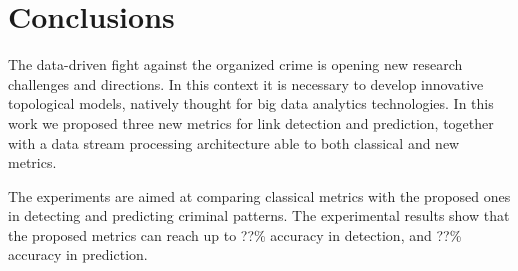 \section{Conclusions}
\label{sec:conclusions}

The data-driven fight against the organized crime is opening new research challenges and directions. 
In this context it is necessary to develop innovative topological models, natively thought for big data analytics technologies.
In this work we proposed three new metrics for link detection and prediction, together with a data stream processing architecture able to both classical and new metrics.

The experiments are aimed at comparing classical metrics with the proposed ones in detecting and predicting criminal patterns. The experimental results show that the proposed metrics can reach up to ??\% accuracy in detection, and ??\% accuracy in prediction.
